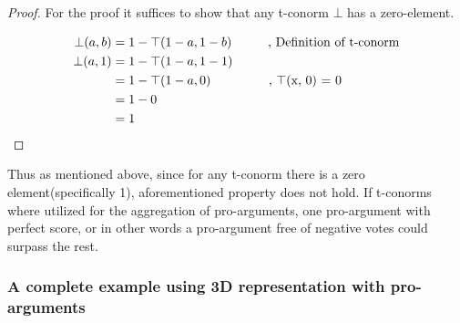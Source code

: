\documentclass{article}
\begin{document}
\begin{proof}
For the proof it suffices to show that any t-conorm $\bot$ has a zero-element.

  \begin{align*}
    \bot(a,b) &= 1 - \top(1-a, 1-b)   \hspace{10 mm} \text{, Definition of t-conorm} \\
    \bot(a,1) &= 1 - \top(1-a, 1-1) \\
	 &= 1 - \top(1-a, 0)  \hspace{16 mm} \text{, $\top$(x, 0) = 0}\\
	 &= 1 - 0\\
         &= 1
  \end{align*}

\end{proof}

Thus as mentioned above, since for any t-conorm there is a zero element(specifically 1), aforementioned property does not hold. If t-conorms where utilized for the aggregation of pro-arguments, one pro-argument with perfect score, or in other words a pro-argument free of negative votes could surpass the rest.



\subsubsection{A complete example using 3D representation with pro-arguments}
\end{document}
